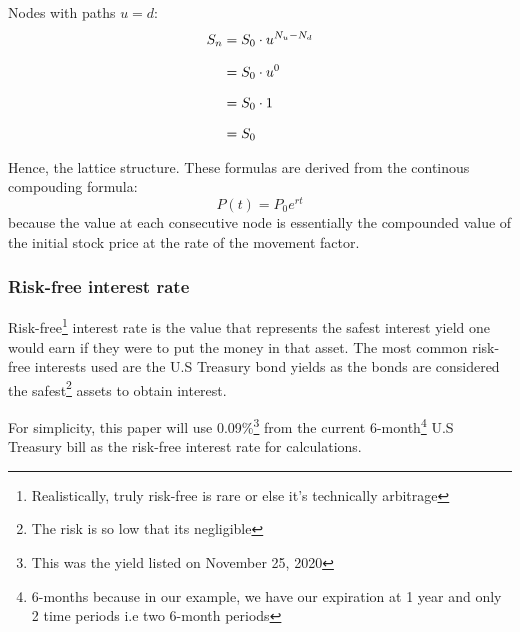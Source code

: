 \documentclass[12pt, letterpaper]{article}\usepackage{float}
\begin{document}
\bigskip

Nodes with paths ${u = d}$:
\begin{equation*}
  \setlength{\jot}{10pt}
  \begin{split}
    {S}_n
    & = {S}_0 \cdot {u}^{N_u-N_d} \\
    & = {S}_0 \cdot {u^0} \\
    & = {S}_0 \cdot 1 \\
    & = {S}_0
  \end{split}
\end{equation*}

\medskip

\noindent Hence, the lattice structure. These formulas are derived from the continous compouding formula\cite{continouscompoundingformulawikipedia}\cite{exponentcharacterizationswikipedia}:
\begin{equation*}
  P(t) = {P_0}e^{rt}
\end{equation*}
because the value at each consecutive node is essentially the compounded value of the initial stock price at the rate of the movement factor.


\subsubsection*{Risk-free interest rate}
Risk-free\footnote{Realistically, truly risk-free is rare or else it's technically arbitrage} interest rate is the value that represents the safest interest yield one would earn if they were to put the money in that asset.
The most common risk-free interests used are the U.S Treasury bond yields as the bonds are considered the safest\footnote{The risk is so low that its negligible} assets to obtain interest.

\medskip

For simplicity, this paper will use 0.09\%\footnote{This was the yield listed on November 25, 2020} from the current 6-month\footnote{6-months because in our example, we have our expiration at 1 year and only 2 time periods i.e two 6-month periods} U.S Treasury bill as the risk-free interest rate for calculations.

\pagebreak
\end{document}
